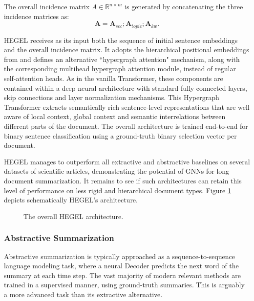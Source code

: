 \documentclass[preprint,review,10pt]{elsarticle}
\begin{document}
	The overall incidence matrix $A \in \mathbb{R}^{n\times m}$ is generated by concatenating the three incidence matrices as:
	\begin{equation}
		\mathbf{A} = \mathbf{A}_{sec};\mathbf{A}_{topic};\mathbf{A}_{kw}.
	\end{equation}
	
	HEGEL receives as its input both the sequence of initial sentence embeddings and the overall incidence matrix. It adopts the hierarchical positional embeddings from \cite{histruct} and defines an alternative ``hypergraph attention" mechanism, along with the corresponding multihead hypergraph attention module, instead of regular self-attention heads. As in the vanilla Transformer, these components are contained within a deep neural architecture with standard fully connected layers, skip connections and layer normalization mechanisms. This Hypergraph Transformer extracts semantically rich sentence-level representations that are well aware of local context, global context and semantic interrelations between different parts of the document. The overall architecture is trained end-to-end for binary sentence classification using a ground-truth binary selection vector per document.
	
	HEGEL manages to outperform all extractive and abstractive baselines on several datasets of scientific articles, demonstrating the potential of GNNs for long document summarization. It remains to see if such architectures can retain this level of performance on less rigid and hierarchical document types. Figure \ref{fig::HEGEL} depicts schematically HEGEL's architecture.
	
	\begin{figure}
		\centering
		
		\caption{The overall HEGEL architecture.}
		\label{fig::HEGEL}
	\end{figure}
	
	\subsubsection{Abstractive Summarization}
	\label{sssec::AbstractiveSum}
	Abstractive summarization is typically approached as a sequence-to-sequence language modeling task, where a neural Decoder predicts the next word of the summary at each time step. The vast majority of modern relevant methods are trained in a supervised manner, using ground-truth summaries. This is arguably a more advanced task than its extractive alternative.
	
\end{document}
